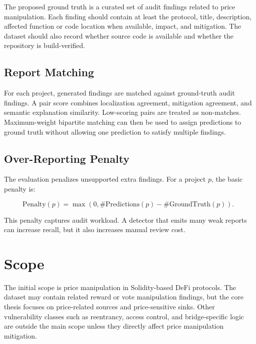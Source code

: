 The proposed ground truth is a curated set of audit findings related to price
manipulation. Each finding should contain at least the protocol, title,
description, affected function or code location when available, impact, and
mitigation. The dataset should also record whether source code is available and
whether the repository is build-verified.

\subsection{Report Matching}

For each project, generated findings are matched against ground-truth audit
findings. A pair score combines localization agreement, mitigation agreement,
and semantic explanation similarity. Low-scoring pairs are treated as
non-matches. Maximum-weight bipartite matching can then be used to assign
predictions to ground truth without allowing one prediction to satisfy multiple
findings.

\subsection{Over-Reporting Penalty}

The evaluation penalizes unsupported extra findings. For a project $p$, the
basic penalty is:

\[
\mathrm{Penalty}(p) = \max(0, \#\mathrm{Predictions}(p) -
\#\mathrm{GroundTruth}(p)).
\]

This penalty captures audit workload. A detector that emits many weak reports
can increase recall, but it also increases manual review cost.

\section{Scope}

The initial scope is price manipulation in Solidity-based DeFi protocols. The
dataset may contain related reward or vote manipulation findings, but the core
thesis focuses on price-related sources and price-sensitive sinks. Other
vulnerability classes such as reentrancy, access control, and bridge-specific
logic are outside the main scope unless they directly affect price manipulation
mitigation.
